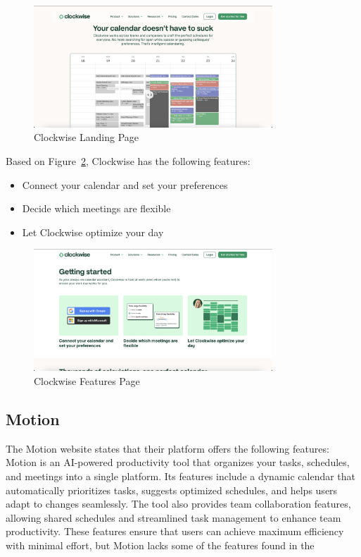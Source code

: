 \documentclass[12pt,a4paper]{report}
\begin{document}
\begin{figure}[!h]
    \centering
    \includegraphics[width=0.8\textwidth]{images/competitors/clockwise-landing.png}
    \caption{Clockwise Landing Page}
    \label{fig:clockwise-landing}
\end{figure}

Based on Figure~\ref{fig:clockwise-features}, Clockwise has the following features:
\begin{itemize}
    \item Connect your calendar and set your preferences
    \item Decide which meetings are flexible
    \item Let Clockwise optimize your day
\end{itemize}

\begin{figure}[!h]
    \centering
    \includegraphics[width=0.8\textwidth]{images/competitors/clockwise-features.png}
    \caption{Clockwise Features Page}
    \label{fig:clockwise-features}
\end{figure}

\subsection{Motion}

The Motion website states that their platform offers the following features: Motion is an AI-powered productivity tool that organizes your tasks, schedules, and meetings into a single platform.
Its features include a dynamic calendar that automatically prioritizes tasks, suggests optimized schedules, and helps users adapt to changes seamlessly.
The tool also provides team collaboration features, allowing shared schedules and streamlined task management to enhance team productivity. These features ensure that users can achieve maximum efficiency with minimal effort, but Motion lacks some of the features found in the
\end{document}
